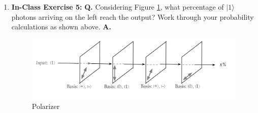 \documentclass[main.tex]{subfiles}
\begin{document}
\begin{enumerate}
\item[] \textbf{In-Class Exercise 5:} \textbf{Q.} Considering Figure \ref{fig:e05polarizer}, what percentage of $|1\rangle$ photons arriving on the left reach the output? Work through your probability calculations as shown above. \textbf{A.}

    \begin{figure}
      \centering
      \includegraphics[width=5in]{modules/figs/m03/e05polarizer.png}
      \caption{Polarizer}
      \label{fig:e05polarizer}
    \end{figure}


\end{enumerate}
\end{document}
